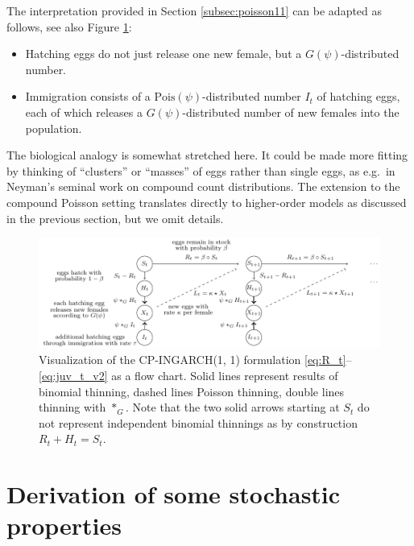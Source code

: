 \documentclass[review]{elsarticle}
\begin{document}
The interpretation provided in Section \ref{subsec:poisson11} can be adapted as follows, see also Figure \ref{fig:ingarch_flowchart}:
\begin{itemize}
\item Hatching eggs do not just release one new female, but a $G(\psi)$-distributed number.
\item Immigration consists of a $\text{Pois}(\psi)$-distributed number $I_t$ of hatching eggs, each of which releases a $G(\psi)$-distributed number of new females into the population.
\end{itemize}
The biological analogy is somewhat stretched here. It could be made more fitting by thinking of ``clusters'' or ``masses'' of eggs rather than single eggs, as e.g.\ in Neyman's \cite{Neyman1939} seminal work on compound count distributions. The extension to the compound Poisson setting translates directly to higher-order models as discussed in the previous section, but we omit details.

\begin{figure}[h!]
\center
\includegraphics[scale = 0.8]{figure/flowchart_ingarch_cp.pdf}
\caption{Visualization of the CP-INGARCH(1, 1) formulation \eqref{eq:R_t}--\eqref{eq:juv_t_v2} as a flow chart. Solid lines represent results of binomial thinning, dashed lines Poisson thinning, double lines thinning with $*_G$. Note that the two solid arrows starting at $S_t$ do not represent independent binomial thinnings as by construction  $R_t + H_t = S_t$.}
\label{fig:ingarch_flowchart}
\end{figure}



\section{Derivation of some stochastic properties}
\end{document}
